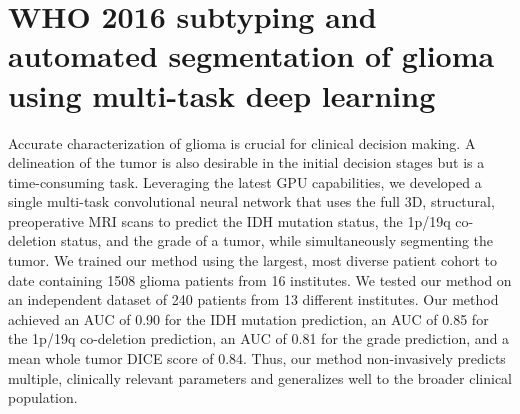 
\chapter[WHO 2016 subtyping and automated segmentation of glioma using multi-task deep learning][WHO 2016 subtyping]{WHO 2016 subtyping and automated segmentation of glioma using multi-task deep learning}\label{chap:prognosais}


\begin{ChapterAbstract}
    Accurate characterization of glioma is crucial for clinical decision making.
    A delineation of the \gls{tumor} is also desirable in the initial decision stages but is a time-consuming task.
    Leveraging the latest GPU capabilities, we developed a single multi-task convolutional neural network that uses the full 3D, structural, preoperative \acrshort{MRI} scans to predict the \acrshort{IDH} mutation status, the 1p/19q co-deletion status, and the grade of a \gls{tumor}, while simultaneously segmenting the \gls{tumor}.
    We trained our method using the largest, most diverse patient cohort to date containing 1508 glioma patients from 16 institutes.
    We tested our method on an independent dataset of 240  patients from 13 different institutes.
    Our method achieved an \acrshort{AUC} of 0.90 for the \acrshort{IDH} mutation prediction, an \acrshort{AUC} of 0.85 for the 1p/19q co-deletion prediction, an \acrshort{AUC} of 0.81 for the grade prediction, and a mean whole \gls{tumor} DICE score of 0.84.
    Thus, our method non-invasively predicts multiple, clinically relevant parameters and generalizes well to the broader clinical population.
\end{ChapterAbstract}


\setcellgapes{5pt}

